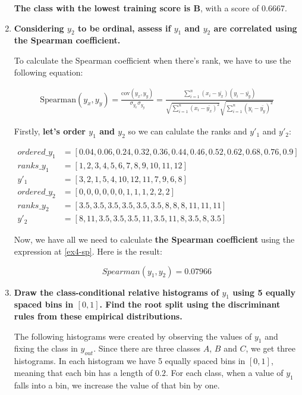 \documentclass[12pt]{article}
\begin{document}
\begin{enumerate}[leftmargin=\labelsep]
    \textbf{The class with the lowest training score is B}, with a score of 0.6667.

    \item \textbf{Considering $y_2$ to be ordinal, assess if $y_1$ and $y_2$ are correlated using the Spearman coefficient.}

    \vskip 0.3cm

    To calculate the Spearman coefficient when there's rank, we have to use the following equation:

    \begin{equation}\label{ex4-sp}
        \begin{split}
            \text{Spearman}(y_x, y_y) = \frac{\text{cov}(y_x, y_y)}{\sigma_{y_x} \sigma_{y_y}}
            = \frac{\sum_{i=1}^{n} (x_i - \bar{y_x})(y_i - \bar{y_y})}{\sqrt{\sum_{i=1}^{n} (x_i- \bar{y_x})^2}\sqrt{\sum_{i=1}^{n} (y_i- \bar{y_y})^2}}
        \end{split}
    \end{equation}

    Firstly, \textbf{let's order $y_1$ and $y_2$} so we can calulate the ranks and $y'_1$ and $y'_2$:

    \begin{align*}
        ordered\_y_{1} & = [0.04, 0.06, 0.24, 0.32, 0.36, 0.44, 0.46, 0.52, 0.62, 0.68, 0.76, 0.9]\\
        ranks\_y_{1}   & = [1,2,3,4,5,6,7,8,9,10,11,12]\\
        y'_{1}         & = [3,2,1,5,4,10,12,11,7,9,6,8]\\
        ordered\_y_{2} & = [0,0,0,0,0,0,1,1,1,2,2,2]\\
        ranks\_y_{2}   & = [3.5, 3.5, 3.5, 3.5, 3.5, 3.5, 8, 8, 8, 11, 11, 11]\\
        y'_{2}         & = [8, 11, 3.5, 3.5, 3.5, 11, 3.5, 11, 8, 3.5, 8, 3.5]
    \end{align*}

    Now, we have all we need to calculate \textbf{the Spearman coefficient} using the expression at \eqref{ex4-sp}. Here is the result:

    \[
        Spearman(y_{1}, y_{2}) = 0.07966
    \]

    \item \textbf{Draw the class-conditional relative histograms of $y_1$ using 5 equally spaced bins in $[0,1]$.
    Find the root split using the discriminant rules from these empirical distributions.}

    \vskip 0.3cm
    The following histograms were created by observing the values of $y_1$ and fixing the class in $y_{out}$. Since there are three classes $A$, $B$ and $C$,
    we get three histograms. In each histogram we have 5 equally spaced bins in $[0,1]$, meaning that each bin has a length of $0.2$. For each class, when a value
    of $y_1$ falls into a bin, we increase the value of that bin by one.


\end{enumerate}
\end{document}
